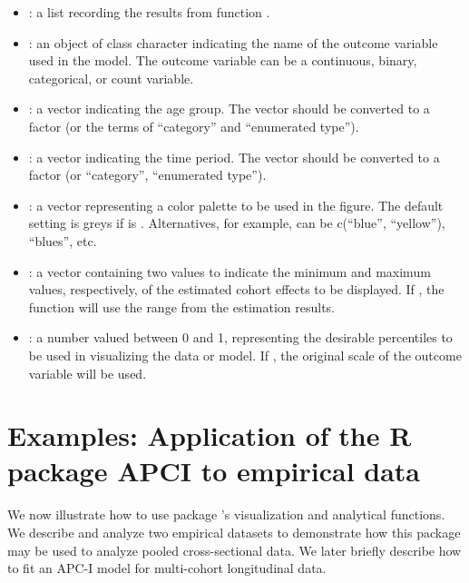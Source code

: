 \begin{itemize}
\item {}: a list recording the results from function {}.

\item {}: an object of class character indicating the name of the outcome variable used in the model. The outcome variable can be a continuous, binary, categorical, or count variable.

\item {}: a vector indicating the age group. The vector should be converted to a factor (or the terms of ``category'' and ``enumerated type'').

\item {}: a vector indicating the time period. The vector should be converted to a factor (or ``category'',  ``enumerated type'').

\item {}: a vector representing a color palette to be used in the figure. The default setting is greys if {} is {}. Alternatives, for example, can be c(``blue'', ``yellow''), ``blues'', etc. 

\item {}: a vector containing two values to indicate the minimum and maximum values, respectively, of the estimated cohort effects to be displayed. If {}, the function will use the range from the estimation results.

\item {}: a number valued between 0 and 1, representing the desirable percentiles to be used in visualizing the data or model. If {}, the original scale of the outcome variable will be used. 

\end{itemize}

\section{Examples: Application of the R package APCI to empirical data} \label{example}

We now illustrate how to use package {}'s visualization and analytical functions.  We describe and analyze two empirical datasets to demonstrate how this package may be used to analyze pooled cross-sectional data. We later briefly describe how to fit an APC-I model for multi-cohort longitudinal data. 






